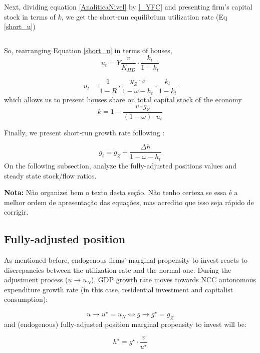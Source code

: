 \documentclass[11pt]{article}
\begin{document}
Next, dividing equation \ref{AnaliticaNivel} by \ref{_YFC} and presenting firm's capital stock in terms of \(k\), we get the short-run equilibrium utilization rate (Eq \ref{short_u})


\begin{equation}
\label{short_u}
\end{equation}

So, rearranging Equation \ref{short_u} in terms of houses,
$$
u_{t} = Y\frac{v}{K_{HD}}\cdot \frac{k_{t}}{1-k_{t}}
$$

\begin{equation}
\label{u_houses}
u_{t} = \frac{1}{1-R}\cdot \frac{g_Z\cdot v}{1 - \omega - h_{t}}\cdot \frac{k_{t}}{1-k_{t}}
\end{equation}
which allows us to present houses share on total capital stock of the economy
\begin{equation}
\label{k_short}
k = 1 - \frac{v\cdot g_Z}{(1 - \omega)\cdot u_{t}}
\end{equation}


Finally, we present short-run growth rate following \textcite{freitas_growth_2015}:

\begin{equation}
\label{g_short}
g_t = g_{Z} + \frac{\Delta h}{1 - \omega - h_{t}}
\end{equation}
On the following subsection, analyze the fully-adjusted positions values and steady state stock/flow ratios.


\textbf{Nota:} Não organizei bem o texto desta seção. Não tenho certeza se essa é a melhor ordem de apresentação das equações, mas acredito que isso seja rápido de corrigir.

\subsection{Fully-adjusted position}
\label{sec:orgcf1a990}
\label{long}


As mentioned before, endogenous firms’ marginal propensity to invest reacts to discrepancies between the utilization rate and the normal one.  During the adjustment process (\(u\to u_N\)), GDP growth rate moves towards NCC autonomous expenditure growth rate (in this case, residential investment and capitalist consumption):

$$
u \to u^{\star}  = u_N \Leftrightarrow g \to g^{\star} = g_Z
$$
and (endogenous) fully-adjusted position marginal propensity to invest will be:


\begin{equation}
\label{h_long}
h^{\star} = g^{\star}\cdot \frac{v}{u^{\star}}
\end{equation}
\end{document}
